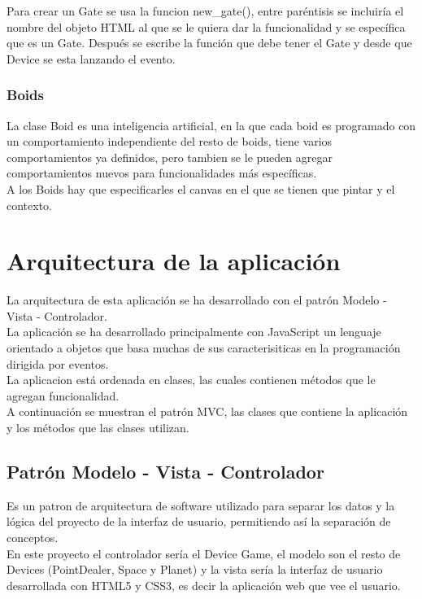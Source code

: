 \documentclass[a4paper,10pt]{article}
\begin{document}
Para crear un Gate se usa la funcion new\_gate(), entre paréntisis se incluiría el nombre del objeto HTML al que se le 
quiera dar la funcionalidad y se específica que es un Gate. Después se escribe la función que debe tener el Gate y desde que Device se
esta lanzando el evento.

\subsubsection{Boids}
La clase Boid es una inteligencia artificial, en la que cada boid es programado con un comportamiento
independiente del resto de boids, tiene varios comportamientos ya definidos, pero tambien se le pueden agregar 
comportamientos nuevos para funcionalidades más específicas.\\

A los Boids hay que especificarles el canvas en el que se tienen que pintar y el contexto.\\


\cleardoublepage

\section{Arquitectura de la aplicación}
La arquitectura de esta aplicación se ha desarrollado con el patrón Modelo - Vista - Controlador.\\

La aplicación se ha desarrollado principalmente con JavaScript un lenguaje orientado a objetos que 
basa muchas de sus caracterisiticas en la programación dirigida por eventos.\\

La aplicacion está ordenada en clases, las cuales contienen métodos que le agregan funcionalidad.\\

A continuación se muestran el patrón MVC, las clases que contiene la aplicación y los métodos que las clases utilizan.
\cleardoublepage

\subsection{Patrón Modelo - Vista - Controlador}
Es un patron de arquitectura de software utilizado para separar los datos y la lógica del proyecto de la interfaz
de usuario, permitiendo así la separación de conceptos.\\

En este proyecto el controlador sería el Device Game, el modelo son el resto de Devices (PointDealer, Space y Planet) y la vista sería la interfaz de 
usuario desarrollada con HTML5 y CSS3, es decir la aplicación web que vee el usuario.\\
\end{document}
